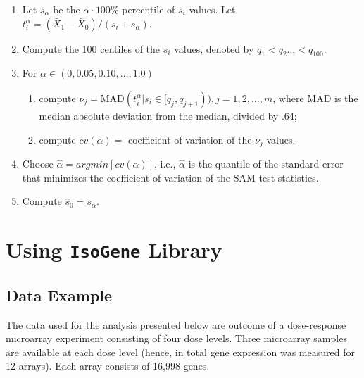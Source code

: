 \begin{enumerate}

\item Let $s_{\alpha}$ be the $\alpha \cdot 100\%$ percentile of $s_i$ values.
Let $t_i^{\alpha}= (\bar{X}_{1}-\bar{X}_{0})/(s_i+s_{\alpha})$.

\item Compute the 100 centiles of the $s_i$ values, denoted by $q_1 <
q_2\dots < q_{100}$.

\item For $\alpha \in (0, 0.05, 0.10, \dots, 1.0)$

\begin{enumerate}

\item compute $\nu_j= \mbox{MAD}(t_i^{\alpha}|s_i \in
[q_j,q_{j+1})),j=1,2,\dots,m$, where \mbox{MAD} is the median
absolute deviation from the median, divided by .64;

\item compute $cv(\alpha)=$ coefficient of variation of the $\nu_j$
values.

\end{enumerate}

\item Choose $\hat{\alpha}=argmin[cv(\alpha)]$, i.e.,
$\hat{\alpha}$ is the quantile of the standard error that minimizes
the coefficient of variation of the SAM test statistics.

\item Compute $\hat{s}_0=s_{\hat{\alpha}}$.

\end{enumerate}




\section{Using \texttt{IsoGene} Library}

\subsection{Data Example}

The data used for the analysis presented below are outcome of a dose-response microarray experiment 
consisting of four dose levels. Three microarray samples are available at each dose level (hence, in total 
gene expression was measured for 12 arrays). Each array consists of 16,998 genes.

